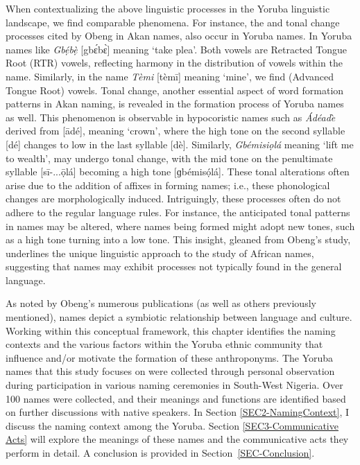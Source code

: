 \documentclass[output=paper,colorlinks,citecolor=brown]{langscibook}
\begin{document}
When contextualizing the above linguistic processes in the Yoruba linguistic landscape, we find comparable phenomena. For instance, the  and tonal change processes cited by Obeng in Akan names, also occur in Yoruba names. In Yoruba names like \textit{Gbẹ́bẹ̀} [gbɛ́bɛ̀] meaning ‘take plea’. Both vowels are Retracted Tongue Root (RTR) vowels, reflecting harmony in the distribution of vowels within the name. Similarly, in the name \textit{Tèmi} [tèmī] meaning ‘mine’, we find  (Advanced Tongue Root) vowels. Tonal change, another essential aspect of word formation patterns in Akan naming, is revealed in the formation process of Yoruba names as well. This phenomenon is observable in hypocoristic names such as \textit{Ádéade}̀ derived from [ādé], meaning ‘crown’, where the high tone on the second  syllable [dé] changes to low in the last syllable [dè]. Similarly, \textit{Gbémisiọlá} meaning ‘lift me to wealth’, may undergo tonal change, with the mid tone on the penultimate syllable [sī-...ọ̄lá] becoming a high tone [ɡbémisọ́lá]. These tonal alterations often arise due to the addition of affixes in forming names; i.e., these phonological changes are morphologically induced. Intriguingly, these processes often do not adhere to the regular language rules. For instance, the anticipated tonal patterns in names may be altered, where names being formed might adopt new tones, such as a high tone turning into a low tone. This insight, gleaned from Obeng’s study, underlines the unique linguistic approach to the study of African names, suggesting that names may exhibit processes not typically found in the general language.

As noted by Obeng’s numerous publications (as well as others previously mentioned), names depict a symbiotic relationship between language and culture. Working within this conceptual framework, this chapter identifies the naming contexts and the various factors within the Yoruba ethnic community that influence and/or motivate the formation of these anthroponyms. The Yoruba names that this study focuses on were collected through personal observation during participation in various naming ceremonies in South-West Nigeria. Over 100 names were collected, and their meanings and functions are identified based on further discussions with native speakers. In Section \ref{SEC2-NamingContext}, I discuss the naming context among the Yoruba. Section \ref{SEC3-Communicative Acts} will explore the meanings of these names and the communicative acts they perform in detail. A conclusion is provided in Section~\ref{SEC-Conclusion}.  
\end{document}
